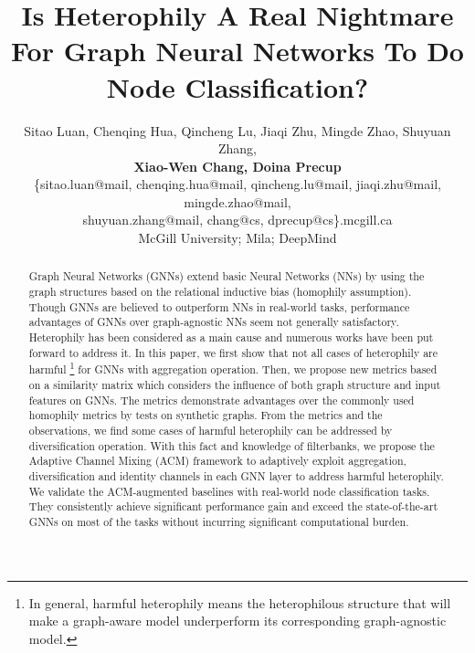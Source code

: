 \documentclass{article}
\title{Is Heterophily A Real Nightmare For Graph Neural Networks To Do Node Classification?}
\author{
Sitao Luan, Chenqing Hua, Qincheng Lu, Jiaqi Zhu, Mingde Zhao, Shuyuan Zhang,\\
\textbf{ Xiao-Wen Chang, Doina Precup}\\
\{sitao.luan@mail, chenqing.hua@mail, qincheng.lu@mail, jiaqi.zhu@mail, mingde.zhao@mail,\\ shuyuan.zhang@mail, chang@cs, dprecup@cs\}.mcgill.ca\\
McGill University; Mila; DeepMind\\
}
\newcommand{\0}{{\boldsymbol{0}}}
\newcommand{\6}{{\partial}}
\newcommand{\8}{{\infty}}
\newcommand{\4}{{\nabla}}
\begin{document}
\maketitle

\begin{abstract}
  Graph Neural Networks (GNNs) extend basic Neural Networks (NNs) by using the graph structures based on the relational inductive bias (homophily assumption). Though GNNs are believed to outperform NNs in real-world tasks, performance advantages of GNNs over graph-agnostic NNs seem not generally satisfactory. Heterophily has been considered as a main cause and numerous works have been put forward to address it. In this paper, we first show that not all cases of heterophily are harmful \footnote{In general, harmful heterophily means the heterophilous structure that will make a graph-aware model underperform its corresponding graph-agnostic model.} for GNNs with aggregation operation. Then, we propose new metrics based on a similarity matrix which considers the influence of both graph structure and input features on GNNs. The metrics demonstrate advantages over the commonly used homophily metrics by tests on synthetic graphs. From the metrics and the observations, we find some cases of harmful heterophily can be addressed by diversification operation. With this fact and knowledge of filterbanks, we propose the Adaptive Channel Mixing (ACM) framework to adaptively exploit aggregation, diversification and identity channels in each GNN layer to address harmful heterophily. We validate the ACM-augmented baselines with  real-world node classification tasks. They consistently achieve significant performance gain and exceed the state-of-the-art GNNs on most of the tasks without incurring significant computational burden. \end{abstract}
\end{document}
